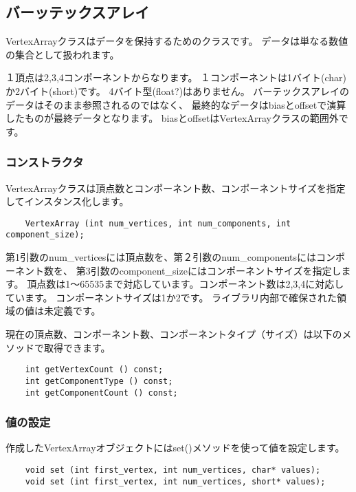 \subsection {バーッテックスアレイ}

VertexArrayクラスはデータを保持するためのクラスです。
データは単なる数値の集合として扱われます。

１頂点は2,3,4コンポーネントからなります。
１コンポーネントは1バイト(char)か2バイト(short)です。
4バイト型(float?)はありません。
バーテックスアレイのデータはそのまま参照されるのではなく、
最終的なデータはbiasとoffsetで演算したものが最終データとなります。
biasとoffsetはVertexArrayクラスの範囲外です。

\subsubsection{コンストラクタ}

VertexArrayクラスは頂点数とコンポーネント数、コンポーネントサイズを指定してインスタンス化します。

\begin{verbatim}
    VertexArray (int num_vertices, int num_components, int component_size);
\end{verbatim}

第1引数のnum\_verticesには頂点数を、第２引数のnum\_componentsにはコンポーネント数を、
第3引数のcomponent\_sizeにはコンポーネントサイズを指定します。
頂点数は1〜65535まで対応しています。コンポーネント数は2,3,4に対応しています。
コンポーネントサイズは1か2です。
ライブラリ内部で確保された領域の値は未定義です。

現在の頂点数、コンポーネント数、コンポーネントタイプ（サイズ）は以下のメソッドで取得できます。

\begin{verbatim}
    int getVertexCount () const;
    int getComponentType () const;
    int getComponentCount () const;
\end{verbatim}

\subsubsection{値の設定}

作成したVertexArrayオブジェクトにはset()メソッドを使って値を設定します。

\begin{verbatim}
    void set (int first_vertex, int num_vertices, char* values);
    void set (int first_vertex, int num_vertices, short* values);
\end{verbatim}

